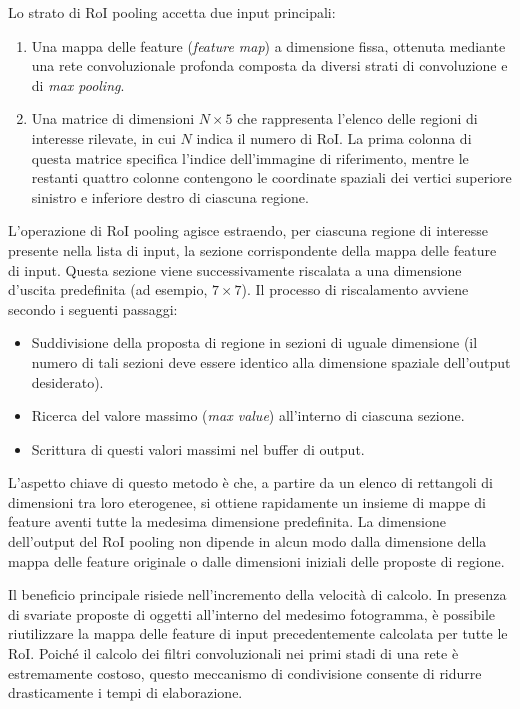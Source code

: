 ﻿\documentclass[11pt, a4paper]{article}
\begin{document}
Lo strato di RoI pooling accetta due input principali:

\begin{enumerate}
    \item Una mappa delle feature (\emph{feature map}) a dimensione fissa, ottenuta mediante una rete convoluzionale profonda composta da diversi strati di convoluzione e di \emph{max pooling}.
    \item Una matrice di dimensioni $N \times 5$ che rappresenta l'elenco delle regioni di interesse rilevate, in cui $N$ indica il numero di RoI. La prima colonna di questa matrice specifica l'indice dell'immagine di riferimento, mentre le restanti quattro colonne contengono le coordinate spaziali dei vertici superiore sinistro e inferiore destro di ciascuna regione.
\end{enumerate}


L'operazione di RoI pooling agisce estraendo, per ciascuna regione di interesse presente nella lista di input, la sezione corrispondente della mappa delle feature di input. Questa sezione viene successivamente riscalata a una dimensione d'uscita predefinita (ad esempio, $7 \times 7$). Il processo di riscalamento avviene secondo i seguenti passaggi:

\begin{itemize}
    \item Suddivisione della proposta di regione in sezioni di uguale dimensione (il numero di tali sezioni deve essere identico alla dimensione spaziale dell'output desiderato).
    \item Ricerca del valore massimo (\emph{max value}) all'interno di ciascuna sezione.
    \item Scrittura di questi valori massimi nel buffer di output.
\end{itemize}

L'aspetto chiave di questo metodo è che, a partire da un elenco di rettangoli di dimensioni tra loro eterogenee, si ottiene rapidamente un insieme di mappe di feature aventi tutte la medesima dimensione predefinita. La dimensione dell'output del RoI pooling non dipende in alcun modo dalla dimensione della mappa delle feature originale o dalle dimensioni iniziali delle proposte di regione.

Il beneficio principale risiede nell'incremento della velocità di calcolo. In presenza di svariate proposte di oggetti all'interno del medesimo fotogramma, è possibile riutilizzare la mappa delle feature di input precedentemente calcolata per tutte le RoI. Poiché il calcolo dei filtri convoluzionali nei primi stadi di una rete è estremamente costoso, questo meccanismo di condivisione consente di ridurre drasticamente i tempi di elaborazione.
\end{document}
